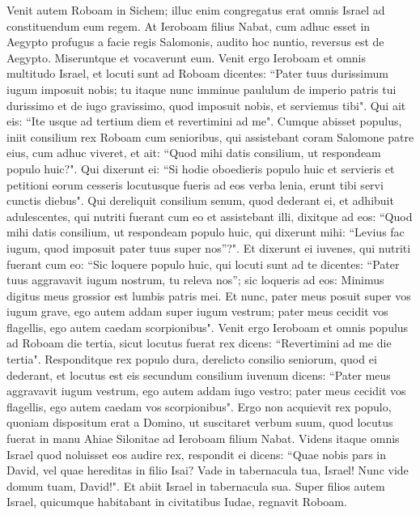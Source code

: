 \begin{biblechapter}  
\verse Venit autem Roboam in Sichem; illuc enim congregatus erat omnis Israel ad constituendum eum regem. 
\verse At Ieroboam filius Nabat, cum adhuc esset in Aegypto profugus a facie regis Salomonis, audito hoc nuntio, reversus est de Aegypto. 
\verse Miseruntque et vocaverunt eum. Venit ergo Ieroboam et omnis multitudo Israel, et locuti sunt ad Roboam dicentes: 
\verse “Pater tuus durissimum iugum imposuit nobis; tu itaque nunc imminue paululum de imperio patris tui durissimo et de iugo gravissimo, quod imposuit nobis, et serviemus tibi". 
\verse Qui ait eis: “Ite usque ad tertium diem et revertimini ad me". Cumque abisset populus, 
\verse iniit consilium rex Roboam cum senioribus, qui assistebant coram Salomone patre eius, cum adhuc viveret, et ait: “Quod mihi datis consilium, ut respondeam populo huic?". 
\verse Qui dixerunt ei: “Si hodie oboedieris populo huic et servieris et petitioni eorum cesseris locutusque fueris ad eos verba lenia, erunt tibi servi cunctis diebus". 
\verse Qui dereliquit consilium senum, quod dederant ei, et adhibuit adulescentes, qui nutriti fuerant cum eo et assistebant illi, 
\verse dixitque ad eos: “Quod mihi datis consilium, ut respondeam populo huic, qui dixerunt mihi: “Levius fac iugum, quod imposuit pater tuus super nos”?". 
\verse Et dixerunt ei iuvenes, qui nutriti fuerant cum eo: “Sic loquere populo huic, qui locuti sunt ad te dicentes: “Pater tuus aggravavit iugum nostrum, tu releva nos”; sic loqueris ad eos: Minimus digitus meus grossior est lumbis patris mei. 
\verse Et nunc, pater meus posuit super vos iugum grave, ego autem addam super iugum vestrum; pater meus cecidit vos flagellis, ego autem caedam scorpionibus". 
\verse Venit ergo Ieroboam et omnis populus ad Roboam die tertia, sicut locutus fuerat rex dicens: “Revertimini ad me die tertia". 
\verse Responditque rex populo dura, derelicto consilio seniorum, quod ei dederant, 
\verse et locutus est eis secundum consilium iuvenum dicens: “Pater meus aggravavit iugum vestrum, ego autem addam iugo vestro; pater meus cecidit vos flagellis, ego autem caedam vos scorpionibus". 
\verse Ergo non acquievit rex populo, quoniam dispositum erat a Domino, ut suscitaret verbum suum, quod locutus fuerat in manu Ahiae Silonitae ad Ieroboam filium Nabat. 
\verse Videns itaque omnis Israel quod noluisset eos audire rex, respondit ei dicens: “Quae nobis pars in David, vel quae hereditas in filio Isai? Vade in tabernacula tua, Israel! Nunc vide domum tuam, David!". Et abiit Israel in tabernacula sua. 
\verse Super filios autem Israel, quicumque habitabant in civitatibus Iudae, regnavit Roboam. 

\end{biblechapter}
